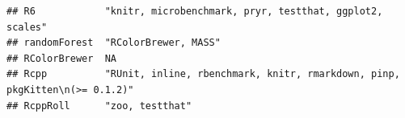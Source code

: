 \documentclass[]{article}
\begin{document}
\begin{verbatim}
## R6            "knitr, microbenchmark, pryr, testthat, ggplot2, scales"                                                                                                                                                                                                                                                                                                                                                                                                                                                                                                                                  
## randomForest  "RColorBrewer, MASS"                                                                                                                                                                                                                                                                                                                                                                                                                                                                                                                                                                      
## RColorBrewer  NA                                                                                                                                                                                                                                                                                                                                                                                                                                                                                                                                                                                        
## Rcpp          "RUnit, inline, rbenchmark, knitr, rmarkdown, pinp, pkgKitten\n(>= 0.1.2)"                                                                                                                                                                                                                                                                                                                                                                                                                                                                                                                
## RcppRoll      "zoo, testthat"                                                                                                                                                                                                                                                                                                                                                                                                                                                                                                                                                                           

\end{verbatim}
\end{document}
